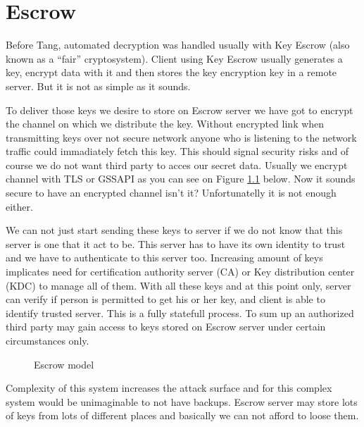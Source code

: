 \documentclass[../xdudla00-porting-Tang-to-Open-WRT.tex]{subfiles}
\begin{document}
\chapter{Escrow}\label{escrow}
Before Tang, automated decryption was handled usually with Key Escrow (also known as a “fair” cryptosystem).
Client using Key Escrow usually generates a key, encrypt data with it and then stores the key encryption key in a remote server.
But it is not as simple as it sounds.

To deliver those keys we desire to store on Escrow server we have got to encrypt the channel on which we distribute the key.
Without encrypted link when transmitting keys over not secure network anyone who is listening to the network traffic could immadiately fetch this key.
This should signal security risks and of course we do not want third party to acces our secret data.
Usually we encrypt channel with TLS or GSSAPI as you can see on Figure \ref{fig:escrowmodel} below. Now it sounds secure to have an encrypted channel isn't it? Unfortunatelly it is not enough either.

We can not just start sending these keys to server if we do not know that this server is one that it act to be.
This server has to have its own identity to trust and we have to authenticate to this server too.
Increasing amount of keys implicates need for certification authority server (CA) or Key distribution center (KDC) to manage all of them.
With all these keys and at this point only, server can verify if person is permitted to get his or her key, and client is able to identify trusted server.
This is a fully statefull process.
To sum up an authorized third party may gain access to keys stored on Escrow server under certain circumstances only.

\begin{figure}[h]
    \centering
    \caption{Escrow model}
    \label{fig:escrowmodel}
\end{figure}

Complexity of this system increases the attack surface and for this complex system would be unimaginable to not have backups.
Escrow server may store lots of keys from lots of different places and basically we can not afford to loose them.
\end{document}
